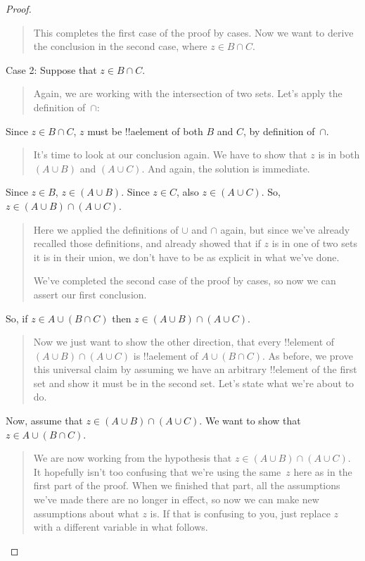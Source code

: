 \documentclass[../../../include/open-logic-section]{subfiles}
\begin{document}
\begin{proof}
\begin{quote}
This completes the first case of the proof by cases. Now we want to
derive the conclusion in the second case, where $z \in B \cap C$.
\end{quote}
Case 2: Suppose that $z \in B \cap C$.
\begin{quote}
Again, we are working with the intersection of two sets. Let's apply
the definition of~$\cap$:
\end{quote}
Since $z \in B \cap C$, $z$ must be !!a{element} of both $B$ and $C$, by
definition of~$\cap$.
\begin{quote}
It's time to look at our conclusion again. We have to show that $z$ is
in both $(A \cup B)$ and $(A \cup C)$. And again, the solution is
immediate.
\end{quote}
Since $z \in B$, $z \in (A \cup B)$. Since $z \in C$, also $z \in (A
\cup C)$.  So, $z \in (A \cup B) \cap (A \cup C)$.
\begin{quote}
Here we applied the definitions of $\cup$ and $\cap$ again, but since
we've already recalled those definitions, and already showed that if
$z$ is in one of two sets it is in their union, we don't have to be as
explicit in what we've done.

We've completed the second case of the proof by cases, so now we can
assert our first conclusion.
\end{quote}
So, if $z \in A \cup (B \cap C)$ then $z \in (A \cup B) \cap (A \cup C)$.
\begin{quote}
Now we just want to show the other direction, that every !!{element}
of $(A \cup B) \cap (A \cup C)$ is !!a{element} of $A \cup (B \cap
C)$. As before, we prove this universal claim by assuming we have an
arbitrary !!{element} of the first set and show it must be in the
second set. Let's state what we're about to do.
\end{quote}
Now, assume that $z \in (A \cup B) \cap (A \cup C)$. We want to show
that $z \in A \cup (B \cap C)$.
\begin{quote}
We are now working from the hypothesis that $z \in (A \cup B) \cap (A
\cup C)$. It hopefully isn't too confusing that we're using the
same~$z$ here as in the first part of the proof.  When we finished
that part, all the assumptions we've made there are no longer in
effect, so now we can make new assumptions about what $z$ is.  If that
is confusing to you, just replace $z$ with a different variable in
what follows.


\end{quote}
\end{proof}
\end{document}
